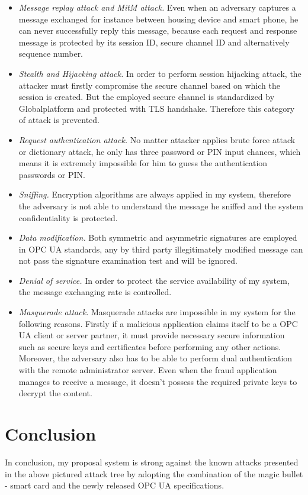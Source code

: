 \begin{itemize}
\item \emph{Message replay attack and MitM attack.} Even when an adversary captures a message  exchanged for instance between housing device and smart phone, he can never successfully reply this message, because each request and response message is protected by its session ID, secure channel ID and alternatively sequence number.
\item \emph{Stealth and Hijacking attack.} In order to perform session hijacking attack, the attacker must firstly compromise the secure channel based on which the session is created. But the employed secure  channel is standardized by Globalplatform and protected with TLS handshake. Therefore this category of attack is prevented.
\item \emph{Request authentication attack.} No matter attacker applies brute force attack or dictionary attack, he only has three password or PIN input chances, which means it is extremely impossible for him to guess the authentication passwords or PIN.
\item \emph{Sniffing.} Encryption algorithms are always  applied in my system, therefore the adversary is not  able to understand  the message he sniffed and the system confidentiality is protected.
\item \emph{Data modification.} Both symmetric and asymmetric signatures are employed in OPC UA standards, any by third party illegitimately modified message can not pass the signature examination test and will be ignored.
\item \emph{Denial of service.} In order to protect  the service availability of my system, the message  exchanging rate is controlled. 
\item \emph{Masquerade attack.} Masquerade attacks are impossible in my system for the following reasons. Firstly if a malicious application claims itself to be a OPC UA client or server partner, it must provide necessary secure information such as secure keys and certificates before performing any other actions. Moreover, the adversary also has to be able to perform dual authentication with the remote administrator server. Even when the fraud application manages to receive a message, it doesn't possess the required  private keys to decrypt the content. 
\end{itemize}

\section{Conclusion}
In conclusion, my proposal system is strong against the known attacks presented in the above pictured attack tree by adopting the combination of the magic bullet - smart card and the newly released OPC UA specifications. 
